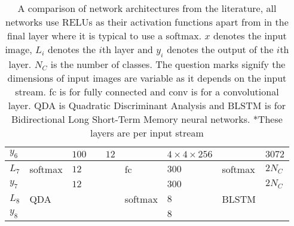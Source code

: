 \begin{landscape}
\begin{table}[h!]
{\begin{tabular}{|lllllllll|}
\multicolumn{1}{|l|}{$y_6$}   &          & \multicolumn{1}{l|}{$100$}                         &          & \multicolumn{1}{l|}{$12$}                            &               & \multicolumn{1}{l|}{$4\times4\times256$}         &           & $3072$                         \\ \hline
\multicolumn{1}{|l|}{$L_7$}   & softmax  & \multicolumn{1}{l|}{$12$}                          &          & \multicolumn{1}{l|}{}                                & fc            & \multicolumn{1}{l|}{$300$}                       & softmax   & $2N_{C}$                       \\
\multicolumn{1}{|l|}{$y_7$}   &          & \multicolumn{1}{l|}{$12$}                          &          & \multicolumn{1}{l|}{}                                &               & \multicolumn{1}{l|}{$300$}                       &           & $2N_{C}$                       \\ \hline
\multicolumn{1}{|l|}{$L_8$}   & QDA      & \multicolumn{1}{l|}{}                              &          & \multicolumn{1}{l|}{}                                & softmax       & \multicolumn{1}{l|}{$8$}                         & BLSTM     &                                \\
\multicolumn{1}{|l|}{$y_8$}   &          & \multicolumn{1}{l|}{}                              &          & \multicolumn{1}{l|}{}                                &               & \multicolumn{1}{l|}{$8$}                         &           &                                \\ \hline
\end{tabular}

\caption{A comparison of network architectures from the literature, all networks
use RELUs as their activation functions apart from in the final layer where it is
typical to use a softmax. $x$ denotes the input image, $L_i$ denotes the $i$th layer and $y_i$ denotes the output of the $i$th layer.
$N_{C}$ is the number of classes.
The question marks signify the dimensions of input images are variable as it depends on the input stream. fc is for fully connected and
conv is for a convolutional layer. QDA is Quadratic Discriminant Analysis and BLSTM is for Bidirectional Long Short-Term Memory neural
networks.
\newline
*These layers are per input stream} \label{compnet}

}
\end{table}
\end{landscape}
